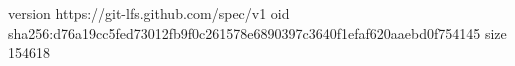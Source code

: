 version https://git-lfs.github.com/spec/v1
oid sha256:d76a19cc5fed73012fb9f0c261578e6890397c3640f1efaf620aaebd0f754145
size 154618

